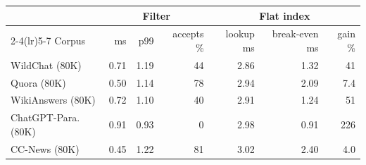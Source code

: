 \begin{tabular}{@{}lrrrrrr@{}}
\toprule
& \multicolumn{3}{c}{Filter} & \multicolumn{3}{c}{Flat index} \\
\cmidrule(lr){2-4}\cmidrule(lr){5-7}
Corpus & ms & p99 & accepts \% & lookup ms & break-even ms & gain \% \\
\midrule
WildChat (80K) & 0.71 & 1.19 & 44 & 2.86 & 1.32 & 41 \\
Quora (80K) & 0.50 & 1.14 & 78 & 2.94 & 2.09 & 7.4 \\
WikiAnswers (80K) & 0.72 & 1.10 & 40 & 2.91 & 1.24 & 51 \\
ChatGPT-Para. (80K) & 0.91 & 0.93 & 0 & 2.98 & 0.91 & 226 \\
CC-News (80K) & 0.45 & 1.22 & 81 & 3.02 & 2.40 & 4.0 \\
\bottomrule
\end{tabular}
